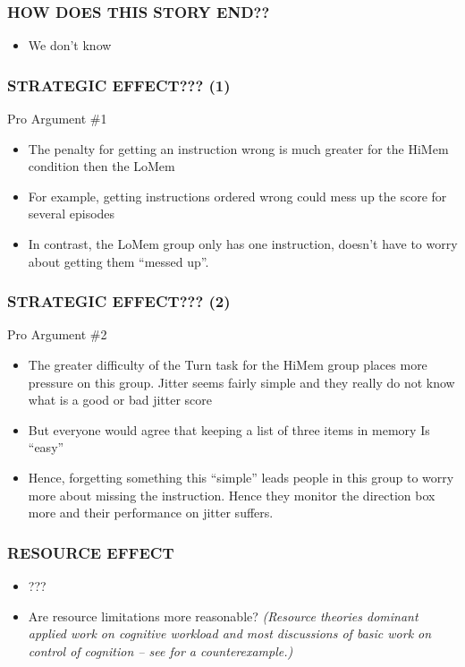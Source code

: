 \documentclass{beamer}
\begin{document}
\begin{frame} 
	\frametitle{HOW DOES THIS STORY END??}
	\begin{itemize}
		\item We don't know
 	\end{itemize}
\end{frame}

\begin{frame} 
	\frametitle{STRATEGIC EFFECT??? (1)}
	Pro Argument \#1
	\begin{itemize}[<+-| alert@+>]
		\item The penalty for getting an instruction wrong is much greater for the HiMem condition then the LoMem
		\item For example, getting instructions ordered wrong could mess up the score for several episodes
		\item In contrast, the LoMem group only has one instruction, doesn't have to worry about getting them ``messed up''. 
 	\end{itemize}
\end{frame}

\begin{frame} 
	\frametitle{STRATEGIC EFFECT??? (2)}
	Pro Argument \#2
		\begin{itemize}[<+-| alert@+>]
		\item The greater difficulty of the Turn task for the HiMem group places more pressure on this group. Jitter seems fairly simple and they really do not know what is a good or bad jitter score
		\item But everyone would agree that keeping a list of three items in memory Is ``easy''
		\item Hence, forgetting something this ``simple'' leads people in this group to worry more about missing the instruction. Hence they monitor the direction box more and their performance on jitter suffers.
	\end{itemize}
\end{frame}

\begin{frame}
	\frametitle{RESOURCE EFFECT}
	\begin{itemize}[<+-| alert@+>]
		\item ???
		\item Are resource limitations more reasonable? \emph{(Resource theories dominant applied work on cognitive workload and most discussions of basic work on control of cognition -- see \textcite{erik08pr.article} for a counterexample.)}
	\end{itemize}
\end{frame}
\end{document}
